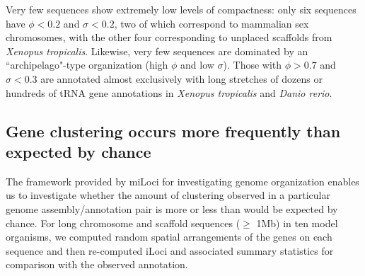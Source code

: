Very few sequences show extremely low levels of compactness: only six sequences have $\phi < 0.2$ and $\sigma < 0.2$, two of which correspond to mammalian sex chromosomes, with the other four corresponding to unplaced scaffolds from \textit{Xenopus tropicalis}.
Likewise, very few sequences are dominated by an ``archipelago"-type organization (high $\phi$ and low $\sigma$).
Those with $\phi > 0.7$ and $\sigma < 0.3$ are annotated almost exclusively with long stretches of dozens or hundreds of tRNA gene annotations in \textit{Xenopus tropicalis} and \textit{Danio rerio}.

\subsection{Gene clustering occurs more frequently than expected by chance}

The framework provided by miLoci for investigating genome organization enables us to investigate whether the amount of clustering observed in a particular genome assembly/annotation pair is more or less than would be expected by chance.
For long chromosome and scaffold sequences ($\geq$ 1Mb) in ten model organisms, we computed random spatial arrangements of the genes on each sequence and then re-computed iLoci and associated summary statistics for comparison with the observed annotation.

